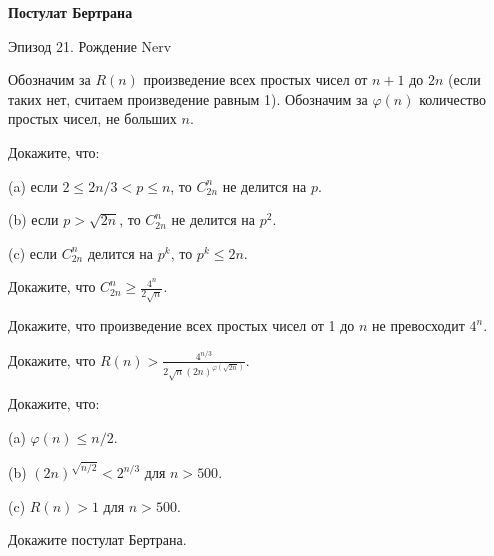 \centerline{\bf \Huge Постулат Бертрана}

\begin{flushright}
        \scriptsize{Эпизод 21. Рождение Nerv}
\end{flushright}

Обозначим за $R(n)$ произведение всех простых чисел от $n+1$ до $2 n$ (если таких нет, считаем произведение равным 1). Обозначим за $\varphi(n)$ количество простых чисел, не больших $n$.

Докажите, что:

(a) если $2 \leqslant 2 n / 3<p \leqslant n$, то $C_{2 n}^n$ не делится на $p$.

(b) если $p>\sqrt{2 n}$, то $C_{2 n}^n$ не делится на $p^2$.

(c) если $C_{2 n}^n$ делится на $p^k$, то $p^k \leqslant 2 n$.

Докажите, что $C_{2 n}^n \geqslant \frac{4^n}{2 \sqrt{n}}$.

Докажите, что произведение всех простых чисел от 1 до $n$ не превосходит $4^n$.

Докажите, что $R(n)>\frac{4^{n / 3}}{2 \sqrt{n}(2 n)^{\varphi(\sqrt{2 n})}}$.

Докажите, что:

(a) $\varphi(n) \leqslant n / 2$.

(b) $(2 n)^{\sqrt{n / 2}}<2^{n / 3}$ для $n>500$.

(c) $R(n)>1$ для $n>500$.

Докажите постулат Бертрана.